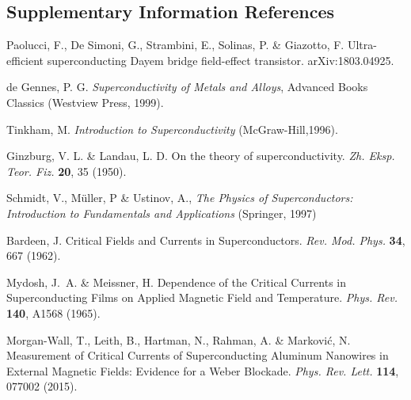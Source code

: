 \documentclass[prl,twocolumn,reprint,graphicx,showpacs,superscriptaddress,floatfix]{revtex4-1}
\begin{document}
\subsection{Supplementary Information  References}
\begin{thebibliography}{99}
	Paolucci, F., De Simoni, G., Strambini, E., Solinas, P. \& Giazotto, F. Ultra-efficient superconducting Dayem bridge field-effect transistor. arXiv:1803.04925.

	de Gennes, P. G. \emph{Superconductivity of Metals and Alloys}, Advanced Books Classics (Westview Press, 1999).

	Tinkham, M. \emph{Introduction to Superconductivity} (McGraw-Hill,1996).

	Ginzburg, V. L. \& Landau, L. D. On the theory of superconductivity. \emph{Zh. Eksp. Teor. Fiz.} \textbf{20}, 35 (1950).

	Schmidt, V.,  M{\"u}ller, P \& Ustinov, A., \emph{The Physics of Superconductors: Introduction to Fundamentals and Applications} (Springer, 1997)


	Bardeen, J. Critical Fields and Currents in Superconductors. \emph{Rev. Mod. Phys.} \textbf{34}, 667 (1962).


	Mydosh, J.~A. \& Meissner, H. Dependence of the Critical Currents in Superconducting Films on Applied Magnetic Field and Temperature. \emph{Phys. Rev.} \textbf{140}, A1568 (1965).


	Morgan-Wall, T., Leith, B., Hartman, N., Rahman, A. \& Markovi\'{c}, N. Measurement of Critical Currents of Superconducting Aluminum Nanowires in External Magnetic Fields: Evidence for a Weber Blockade. \emph{Phys. Rev. Lett.} \textbf{114}, 077002 (2015).

\end{thebibliography}
 
\end{document}
